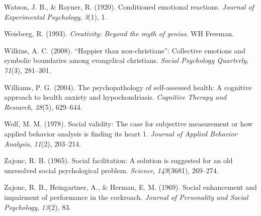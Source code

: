 \documentclass[
]{krantz}
\newlength{\cslhangindent}
\newlength{\cslentryspacingunit} %
\newenvironment{CSLReferences}[2] %
 {%
  \setlength{\parindent}{0pt}
  \ifodd #1
  \let\oldpar\par
  \def\par{\hangindent=\cslhangindent\oldpar}
  \fi
  \setlength{\parskip}{#2\cslentryspacingunit}
 }%
 {}
\begin{document}
\begin{CSLReferences}{1}{0}
\leavevmode{}%
Watson, J. B., \& Rayner, R. (1920). Conditioned emotional reactions. \emph{Journal of Experimental Psychology}, \emph{3}(1), 1.

\leavevmode{}%
Weisberg, R. (1993). \emph{Creativity: Beyond the myth of genius}. WH Freeman.

\leavevmode{}%
Wilkins, A. C. (2008). {``Happier than non-christians''}: Collective emotions and symbolic boundaries among evangelical christians. \emph{Social Psychology Quarterly}, \emph{71}(3), 281--301.

\leavevmode{}%
Williams, P. G. (2004). The psychopathology of self-assessed health: A cognitive approach to health anxiety and hypochondriasis. \emph{Cognitive Therapy and Research}, \emph{28}(5), 629--644.

\leavevmode{}%
Wolf, M. M. (1978). Social validity: The case for subjective measurement or how applied behavior analysis is finding its heart 1. \emph{Journal of Applied Behavior Analysis}, \emph{11}(2), 203--214.

\leavevmode{}%
Zajonc, R. B. (1965). Social facilitation: A solution is suggested for an old unresolved social psychological problem. \emph{Science}, \emph{149}(3681), 269--274.

\leavevmode{}%
Zajonc, R. B., Heingartner, A., \& Herman, E. M. (1969). Social enhancement and impairment of performance in the cockroach. \emph{Journal of Personality and Social Psychology}, \emph{13}(2), 83.

\end{CSLReferences}
\end{document}
